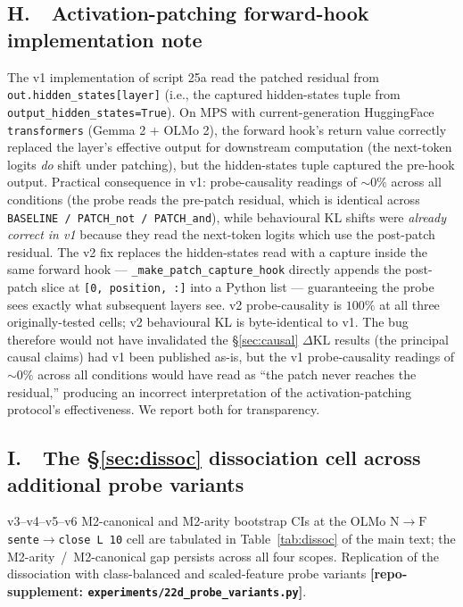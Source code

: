 \documentclass[11pt,letterpaper]{article}
\newcommand{\dkl}{\ensuremath{\Delta\mathrm{KL}}}
\newcommand{\NtoF}{\ensuremath{\mathrm{N}\!\to\!\mathrm{F}}}
\newcommand{\Mc}{M2-canonical}
\newcommand{\Ma}{M2-arity}
\begin{document}
\subsection*{H.\ \ Activation-patching forward-hook implementation note}
\label{app:hook}
The v1 implementation of script 25a read the patched residual from
\texttt{out.hidden\_states[layer]} (i.e., the captured
hidden-states tuple from \texttt{output\_hidden\_states=True}). On
MPS with current-generation HuggingFace \texttt{transformers}
(Gemma 2 + OLMo 2), the forward hook's return value correctly
replaced the layer's effective output for downstream computation
(the next-token logits \emph{do} shift under patching), but the
hidden-states tuple captured the pre-hook output. Practical
consequence in v1: probe-causality readings of ${\sim}0\%$ across
all conditions (the probe reads the pre-patch residual, which is
identical across \texttt{BASELINE / PATCH\_not / PATCH\_and}),
while behavioural KL shifts were \emph{already correct in v1}
because they read the next-token logits which use the post-patch
residual. The v2 fix replaces the hidden-states read with a capture
inside the same forward hook ---
\texttt{\_make\_patch\_capture\_hook} directly appends the
post-patch slice at \texttt{[0, position, :]} into a Python list
--- guaranteeing the probe sees exactly what subsequent layers see.
v2 probe-causality is $100\%$ at all three originally-tested cells;
v2 behavioural KL is byte-identical to v1. The bug therefore would
not have invalidated the \S\ref{sec:causal} \dkl{} results (the
principal causal claims) had v1 been published as-is, but the v1
probe-causality readings of ${\sim}0\%$ across all conditions would
have read as ``the patch never reaches the residual,'' producing an
incorrect interpretation of the activation-patching protocol's
effectiveness. We report both for transparency.

\subsection*{I.\ \ The \S\ref{sec:dissoc} dissociation cell across additional probe variants}
v3--v4--v5--v6 \Mc{} and \Ma{} bootstrap
CIs at the OLMo \texttt{\NtoF{} sente$\to$close L\,10} cell are
tabulated in Table~\ref{tab:dissoc} of the main text; the
\Ma{}~/~\Mc{} gap persists across all four scopes. Replication of
the dissociation with class-balanced and scaled-feature probe
variants \textbf{[repo-supplement:
\texttt{experiments/22d\_probe\_variants.py}]}.
\end{document}
